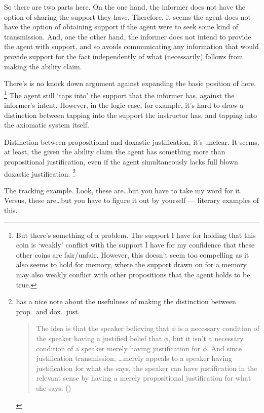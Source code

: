 \documentclass[10pt]{article}
\begin{document}
So there are two parts here.
On the one hand, the informer does not have the option of sharing the support they have.
Therefore, it seems the agent does not have the option of obtaining support if the agent were to seek some kind of transmission.
And, one the other hand, the informer does not intend to provide the agent with support, and so avoids communicating any information that would provide support for the fact independently of what (necessarily) follows from making the ability claim.

There's is no knock down argument against expanding the basic position of \citeauthor{Owens:2006tw} here.\nolinebreak
\footnote{
But there's something of a problem.
The support I have for holding that this coin is `weakly' conflict with the support I have for my confidence that these other coins are fair/unfair.
However, this doesn't seem too compelling as it also seems to hold for memory, where the support drawn on for a memory may also weakly conflict with other propositions that the agent holds to be true.
}
The agent still `taps into' the support that the informer has, against the informer's intent.
However, in the logic case, for example, it's hard to draw a distinction between tapping into the support the instructor has, and tapping into the axiomatic system itself.

Distinction between propositional and doxastic justification, it's unclear.
It seems, at least, the given the ability claim the agent has something more than propositional justification, even if the agent simultaneously lacks full blown doxastic justification.\nolinebreak
\footnote{
  \textcite{Wright:2016wl} has a nice note about the usefulness of making the distinction between prop.\ and dox.\ just.\
  \begin{quote}
    The idea is that the speaker believing that \(\phi\) is a necessary condition of the speaker having a justified belief that \(\phi\), but it isn't a necessary condition of a speaker merely having justification for \(\phi\).
    And since justification transmission, \dots merely appeals to a speaker having justification for what she says, the speaker can have justification in the relevant sense by having a merely propositional justification for what she says.\nolinebreak
    \mbox{}\hfill\mbox{(\citeyear[10]{Wright:2016wl})}
  \end{quote}
}


\begin{note}
  The tracking example.
  Look, these are\dots but you have to take my word for it.
  Versus, these are\dots but you have to figure it out by yourself --- literary examples of this.
\end{note}
\end{document}
